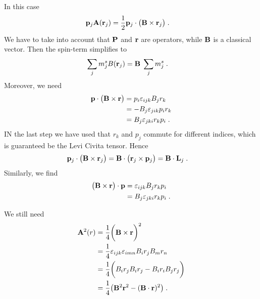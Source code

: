 %
In this case 
%
\begin{align*}
\mathbf p_{j} \mathbf A(\mathbf r_{j}) &= 
\frac{1}{2}\mathbf p_{j} \cdot \big(\mathbf B\times \mathbf r_{j}\big)\;.
\end{align*}
%
We have to take into account that $\mathbf P$ and $\mathbf r$ are operators, while 
$\mathbf B$ is a classical vector. Then the spin-term simplifies to
%
\begin{align*}
\sum_{j}  m^{s}_{j}B(\mathbf r_{j}) &= \mathbf B \;\sum_{j} m^{s}_{j}\;.
\end{align*}
%
Moreover, we need
%
\begin{align*}
\mathbf p\cdot \big( \mathbf B\times \mathbf r \big) 
&=p_{i} \varepsilon_{ijk} B_{j} r_{k}\\
&=-B_{j}  \varepsilon_{jik} p_{i} r_{k}\\
&=B_{j}  \varepsilon_{jki} r_{k} p_{i} \;.
\end{align*}
%
IN the last step we have used that $r_{k}$ and $p_{j}$ commute for different indices, which is guaranteed be the Levi Civita tensor.
Hence
%
\begin{align}\label{eq:}
\mathbf p_{j}\cdot \big( \mathbf B\times \mathbf r_{j} \big)  &=
\mathbf B\cdot \big( \mathbf r_{j}\times \mathbf p_{j}\big) =\mathbf B \cdot \mathbf L_{j}\;.
\end{align}
%
Similarly, we find
\begin{align*}
\big( \mathbf B\times \mathbf r \big) \cdot \mathbf p
&= \varepsilon_{ijk} B_{j} r_{k}p_{i}\\
&=B_{j}  \varepsilon_{jki} r_{k} p_{i} \;.
\end{align*}

We still need 
%
\begin{align*}
\mathbf A^{2}(r) &= \frac{1}{4} \bigg( \mathbf B \times \mathbf r \bigg)^{2}\\
&=\frac{1}{4}\varepsilon_{ijk}\varepsilon_{imn} B_{i} r_{j} 
B_{m}r_{n}\\
&=\frac{1}{4}\bigg(B_{i} r_{j} B_{i}r_{j}
-B_{i} r_{i} B_{j}r_{j}\bigg)\\
&=\frac{1}{4}\big(\mathbf B^{2}\mathbf r^{2} -(\mathbf B\cdot \mathbf r)^{2}\big)\;.
\end{align*}
%

